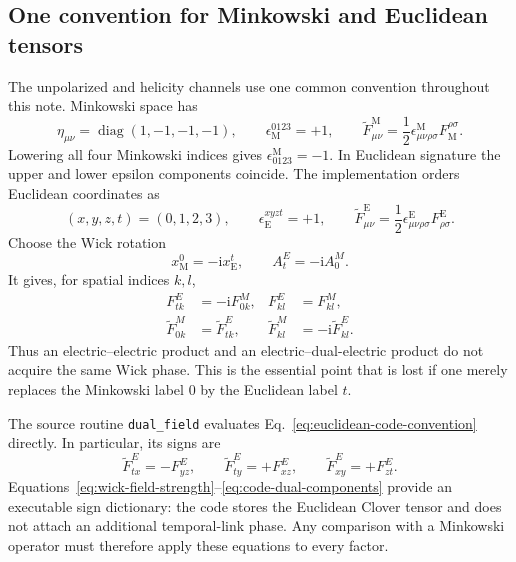 \documentclass[11pt]{article}
\numberwithin{equation}{section}
\newcommand{\ii}{\mathrm{i}}
\begin{document}
\subsection{One convention for Minkowski and Euclidean tensors}
\label{sec:gluon-wick-convention}

The unpolarized and helicity channels use one common convention throughout
this note.  Minkowski space has
\begin{equation}
 \eta_{\mu\nu}=\operatorname{diag}(1,-1,-1,-1),
 \qquad \epsilon_{\mathrm M}^{0123}=+1,
 \qquad
 \widetilde F^{\mathrm M}_{\mu\nu}
 =\frac12\epsilon^{\mathrm M}_{\mu\nu\rho\sigma}
 F_{\mathrm M}^{\rho\sigma}.
 \label{eq:minkowski-tensor-convention}
\end{equation}
Lowering all four Minkowski indices gives \(\epsilon^{\mathrm M}_{0123}=-1\).
In Euclidean signature the upper and lower epsilon components coincide.
The implementation orders Euclidean coordinates as
\begin{equation}
 (x,y,z,t)=(0,1,2,3),
 \qquad \epsilon_{\mathrm E}^{xyzt}=+1,
 \qquad
 \widetilde F^{\mathrm E}_{\mu\nu}
 =\frac12\epsilon^{\mathrm E}_{\mu\nu\rho\sigma}
 F^{\mathrm E}_{\rho\sigma}.
 \label{eq:euclidean-code-convention}
\end{equation}
Choose the Wick rotation
\begin{equation}
 x^0_{\mathrm M}=-\ii x^t_{\mathrm E},
 \qquad A^E_t=-\ii A^M_0.
 \label{eq:wick-rotation-choice}
\end{equation}
It gives, for spatial indices \(k,l\),
\begin{align}
 F^E_{tk}&=-\ii F^M_{0k},
 &F^E_{kl}&=F^M_{kl},
 \label{eq:wick-field-strength}\\
 \widetilde F^M_{0k}&=\widetilde F^E_{tk},
 &\widetilde F^M_{kl}&=-\ii\widetilde F^E_{kl}.
 \label{eq:wick-dual-strength}
\end{align}
Thus an electric--electric product and an electric--dual-electric product do
not acquire the same Wick phase.  This is the essential point that is lost if
one merely replaces the Minkowski label \(0\) by the Euclidean label \(t\).

The source routine \texttt{dual\_field} evaluates
Eq.~\eqref{eq:euclidean-code-convention} directly.  In particular, its signs
are
\begin{equation}
 \widetilde F^E_{tx}=-F^E_{yz},
 \qquad
 \widetilde F^E_{ty}=+F^E_{xz},
 \qquad
 \widetilde F^E_{xy}=+F^E_{zt}.
 \label{eq:code-dual-components}
\end{equation}
Equations~\eqref{eq:wick-field-strength}--\eqref{eq:code-dual-components}
provide an executable sign dictionary: the code stores the Euclidean Clover
tensor and does not attach an additional temporal-link phase.  Any comparison
with a Minkowski operator must therefore apply these equations to every
factor.
\end{document}
